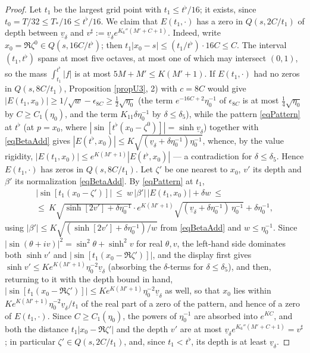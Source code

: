 \documentclass[11pt,twoside,reqno]{amsart}
\def\d{\delta}
\def\b{\beta}
\def\uv{\underline{v}_{\d}}
\theoremstyle{plain}
\numberwithin{equation}{section}
\begin{document}
\begin{proof}
Let $t_1$ be the largest grid point with $t_1\leq t^\flat/16$; it exists, since $t_0=T/32\leq T_*/16\leq t^\flat/16$. We claim that $E(t_1,\cdot)$ has a zero in $Q(s,2C/t_1)$ of depth between $\uv$ and $v^\sharp:=\uv e^{K_6''(M'+C+1)}$. Indeed, write $x_0=\Re\zeta^0\in Q(s,16C/t^\flat)$; then $t_1|x_0-s|\leq(t_1/t^\flat)\cdot16C\leq C$. The interval $(t_1,t^\flat)$ spans at most five octaves, at most one of which may intersect $(0,1)$, so the mass $\int_{t_1}^{t^\flat}|f|$ is at most $5M+M'\leq K(M'+1)$. If $E(t_1,\cdot)$ had no zeros in $Q(s,8C/t_1)$, Proposition \ref{propU3}, 2) with $c=8C$ would give $|E(t_1,x_0)|\geq1/\sqrt w-\epsilon_{8C}\geq\tfrac12\sqrt{\eta_0}$ (the term $e^{-16C+2}\eta_0^{-1}$ of $\epsilon_{8C}$ is at most $\tfrac14\sqrt{\eta_0}$ by $C\geq C_1(\eta_0)$, and the term $K_{11}\d\eta_0^{-1}$ by $\d\leq\d_5$), while the pattern \eqref{eqPattern} at $t^\flat$ (at $p=x_0$, where $|\sin[t^\flat(x_0-\zeta^0)]|=\sinh\uv$) together with \eqref{eqBetaAdd} gives $|E(t^\flat,x_0)|\leq K\sqrt{(\uv+\d\eta_0^{-1})\eta_0^{-1}}$, whence, by the value rigidity, $|E(t_1,x_0)|\leq e^{K(M'+1)}|E(t^\flat,x_0)|$ --- a contradiction for $\d\leq\d_5$. Hence $E(t_1,\cdot)$ has zeros in $Q(s,8C/t_1)$. Let $\zeta'$ be one nearest to $x_0$, $v'$ its depth and $\b'$ its normalization \eqref{eqBetaAdd}. By \eqref{eqPattern} at $t_1$,
$$\begin{gathered}\left|\sin[t_1(x_0-\zeta')]\right|\ \leq\ w\,|\b'|\,|E(t_1,x_0)|+\d w\ \leq\\ \leq\ K\sqrt{\sinh[2v']+\d\eta_0^{-1}}\cdot e^{K(M'+1)}\sqrt{(\uv+\d\eta_0^{-1})\,\eta_0^{-1}}+\d\eta_0^{-1},\end{gathered}$$
using $|\b'|\leq K\sqrt{(\sinh[2v']+\d\eta_0^{-1})/w}$ from \eqref{eqBetaAdd} and $w\leq\eta_0^{-1}$. Since $|\sin(\theta+iv)|^2=\sin^2\theta+\sinh^2v$ for real $\theta,v$, the left-hand side dominates both $\sinh v'$ and $|\sin[t_1(x_0-\Re\zeta')]|$, and the display first gives $\sinh v'\leq K e^{K(M'+1)}\eta_0^{-2}\uv$ (absorbing the $\d$-terms for $\d\leq\d_5$), and then, returning to it with the depth bound in hand, $|\sin[t_1(x_0-\Re\zeta')]|\leq Ke^{K(M'+1)}\eta_0^{-2}\uv$ as well, so that $x_0$ lies within $Ke^{K(M'+1)}\eta_0^{-2}\uv/t_1$ of the real part of a zero of the pattern, and hence of a zero of $E(t_1,\cdot)$. Since $C\geq C_1(\eta_0)$, the powers of $\eta_0^{-1}$ are absorbed into $e^{KC}$, and both the distance $t_1|x_0-\Re\zeta'|$ and the depth $v'$ are at most $\uv e^{K_6''(M'+C+1)}=v^\sharp$; in particular $\zeta'\in Q(s,2C/t_1)$, and, since $t_1<t^\flat$, its depth is at least $\uv$.


\end{proof}
\end{document}
